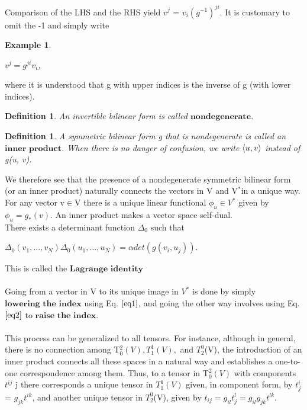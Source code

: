 \documentclass[12pt,a4paper]{article}
\newtheorem{defn}[thm]{Definition}
\newtheorem{exmp}{Example}[section]
\begin{document}
\indent Comparison of the LHS and the RHS yield $v^j$ = $v_i(g^{-1})^{ji}$. It is customary
to omit the -1 and simply write \\
\begin{exmp}\label{eq2}
\begin{center} 
$v^j = g ^ {ji} v_{i}$,
\end{center}
\end{exmp}
where it is understood that g with upper indices is the inverse of g (with
lower indices). \\
\begin{defn}
An invertible bilinear form is called $\textbf{nondegenerate}$.
\end{defn}
\begin{defn}
A symmetric bilinear form g that is nondegenerate is called an $\textbf{inner product}$. When there is no danger of confusion, we write $\braket{u, v}$ instead of g(u, v).
\end{defn}
We therefore see that the presence of a nondegenerate symmetric bilinear
form (or an inner product) naturally connects the vectors in V and V$^*$in a
unique way. For any vector v$\in$V there is a unique linear functional $\phi_u \in V^*$
given by $\phi_u = g_*(v)$. An inner product
makes a vector space self-dual. \\There exists a determinant function $\Delta_0$ such that
\begin{center}
$\Delta_0 (v_1, ... , v_N) \Delta_0 ( u_1, ..., u_N) = \alpha det(g(v_i, u_j))$.
\end{center}
This is called the $\textbf{Lagrange identity}$\\
\\
Going from a vector in V to its unique image in $V^*$ is done by simply $\textbf{lowering the index}$ using Eq. $\ref{eq1}$, and going the other way involves using Eq. $\ref{eq2}$ to $\textbf{raise the index}$.\\
\\
This process can be generalized to all tensors. For instance, although in general, there is no connection among T$^2_0(V), T^1_1(V),$ and $T_2^0$(V), the introduction of an inner product connects all
these spaces in a natural way and establishes a one-to-one correspondence
among them. Thus, to a tensor in T$^2_0(V)$ with components $t^{ij}$ j there corresponds a unique tensor in $T^1_1(V)$ given, in component form, by $t_j^i$ = $g_{jk}t^{ik}$, and another unique tensor in $T_2^0$(V), given by $t_{ij} = g_{il} t^l_j = g_{il} g_{jk} t^{lk}$.\\\\
\end{document}
